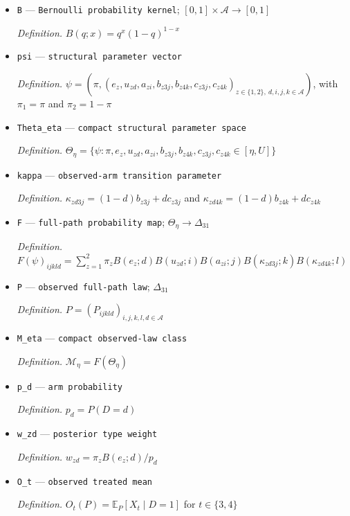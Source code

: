 \documentclass{article}
\begin{document}
\begin{itemize}
  \item \texttt{B} --- \texttt{Bernoulli probability kernel}; \([0,1]\times\mathcal A\to[0,1]\)
  \par\smallskip\noindent\emph{Definition.} \(B(q;x)=q^x(1-q)^{1-x}\)
  \item \texttt{psi} --- \texttt{structural parameter vector}
  \par\smallskip\noindent\emph{Definition.} \(\psi=(\pi,(e_z,u_{zd},a_{zi},b_{z3j},b_{z4k},c_{z3j},c_{z4k})_{z\in\{1,2\},\ d,i,j,k\in\mathcal A})\), with \(\pi_1=\pi\) and \(\pi_2=1-\pi\)
  \item \texttt{Theta\_\allowbreak{}eta} --- \texttt{compact structural parameter space}
  \par\smallskip\noindent\emph{Definition.} \(\Theta_\eta=\{\psi:\pi,e_z,u_{zd},a_{zi},b_{z3j},b_{z4k},c_{z3j},c_{z4k}\in[\eta,U]\}\)
  \item \texttt{kappa} --- \texttt{observed-\allowbreak{}arm transition parameter}
  \par\smallskip\noindent\emph{Definition.} \(\kappa_{zd3j}=(1-d)b_{z3j}+dc_{z3j}\) and \(\kappa_{zd4k}=(1-d)b_{z4k}+dc_{z4k}\)
  \item \texttt{F} --- \texttt{full-\allowbreak{}path probability map}; \(\Theta_\eta\to\Delta_{31}\)
  \par\smallskip\noindent\emph{Definition.} \(F(\psi)_{ijkld}=\sum_{z=1}^{2}\pi_zB(e_z;d)B(u_{zd};i)B(a_{zi};j)B(\kappa_{zd3j};k)B(\kappa_{zd4k};l)\)
  \item \texttt{P} --- \texttt{observed full-\allowbreak{}path law}; \(\Delta_{31}\)
  \par\smallskip\noindent\emph{Definition.} \(P=(P_{ijkld})_{i,j,k,l,d\in\mathcal A}\)
  \item \texttt{M\_\allowbreak{}eta} --- \texttt{compact observed-\allowbreak{}law class}
  \par\smallskip\noindent\emph{Definition.} \(\mathcal M_\eta=F(\Theta_\eta)\)
  \item \texttt{p\_\allowbreak{}d} --- \texttt{arm probability}
  \par\smallskip\noindent\emph{Definition.} \(p_d=P(D=d)\)
  \item \texttt{w\_\allowbreak{}zd} --- \texttt{posterior type weight}
  \par\smallskip\noindent\emph{Definition.} \(w_{zd}=\pi_zB(e_z;d)/p_d\)
  \item \texttt{O\_\allowbreak{}t} --- \texttt{observed treated mean}
  \par\smallskip\noindent\emph{Definition.} \(O_t(P)=\mathbb E_P[X_t\mid D=1]\) for \(t\in\{3,4\}\)

\end{itemize}
\end{document}
